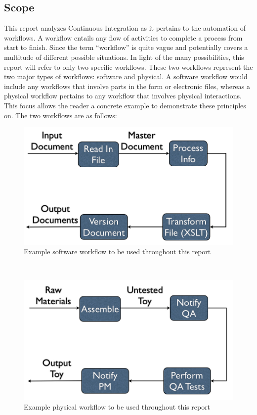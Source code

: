 	\subsection{Scope} %
	\label{sub:scope}
This report analyzes Continuous Integration as it pertains to the automation of workflows. A workflow entails any flow of activities to complete a process from start to finish. Since the term ``workflow'' is quite vague and potentially covers a multitude of different possible situations. In light of the many possibilities, this report will refer to only two specific workflows.  These two workflows represent the two major types of workflows: software and physical.  A software workflow would include any workflows that involve parts in the form or electronic files, whereas a physical workflow pertains to any workflow that involves physical interactions.  This focus allows the reader a concrete example to demonstrate these principles on.  The two workflows are as follows:\\
		\begin{figure}[htp]
			\centering
			\subfigure{}
			\includegraphics[width=.90\textwidth]{images/software_workflow}
			\caption[Software Workflow]{Example software workflow to be used throughout this report}
			\label{fig:software_workflow}
		\end{figure}\\
		\begin{figure}[htp]
			\centering
			\includegraphics[width=.90\textwidth]{images/physical_workflow}
			\caption[Physical Workflow]{Example physical workflow to be used throughout this report}
			\label{fig:physical_workflow}
		\end{figure}\\
